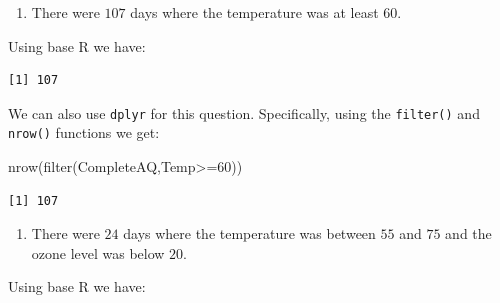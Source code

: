 \documentclass[
  letterpaper,
  DIV=11,
  numbers=noendperiod]{scrreprt}
\newenvironment{Shaded}{\begin{snugshade}}{\end{snugshade}}
\newcommand{\DecValTok}[1]{\textcolor[rgb]{0.68,0.00,0.00}{#1}}
\newcommand{\FunctionTok}[1]{\textcolor[rgb]{0.28,0.35,0.67}{#1}}
\newcommand{\NormalTok}[1]{\textcolor[rgb]{0.00,0.23,0.31}{#1}}
\newcommand{\SpecialCharTok}[1]{\textcolor[rgb]{0.37,0.37,0.37}{#1}}
\providecommand{\tightlist}{%
  \setlength{\itemsep}{0pt}\setlength{\parskip}{0pt}}\usepackage{longtable,booktabs,array}
\begin{document}
\begin{enumerate}
\def\labelenumi{\arabic{enumi}.}
\setcounter{enumi}{4}
\tightlist
\item
  There were \(107\) days where the temperature was at least \(60\).
\end{enumerate}

Using base R we have:

\begin{Shaded}
\end{Shaded}

\begin{verbatim}
[1] 107
\end{verbatim}

We can also use \texttt{dplyr} for this question. Specifically, using
the \texttt{filter()} and \texttt{nrow()} functions we get:

\begin{Shaded}
\begin{Highlighting}[numbers=left,,]
\FunctionTok{nrow}\NormalTok{(}\FunctionTok{filter}\NormalTok{(CompleteAQ,Temp}\SpecialCharTok{\textgreater{}=}\DecValTok{60}\NormalTok{))}
\end{Highlighting}
\end{Shaded}

\begin{verbatim}
[1] 107
\end{verbatim}

\begin{enumerate}
\def\labelenumi{\arabic{enumi}.}
\setcounter{enumi}{5}
\tightlist
\item
  There were \(24\) days where the temperature was between \(55\) and
  \(75\) and the ozone level was below \(20\).
\end{enumerate}

Using base R we have:

\begin{Shaded}
\end{Shaded}
\end{document}
